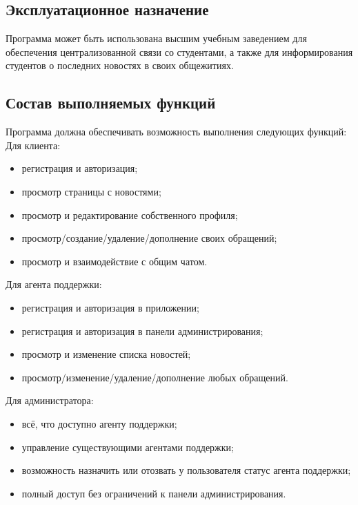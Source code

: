 \documentclass{../includes/TechDoc}
\begin{document}
    \subsection{Эксплуатационное назначение}

    Программа может быть использована высшим учебным заведением для обеспечения централизованной связи со студентами, а
    также для информирования студентов о последних новостях в своих общежитиях.

    \subsection{Состав выполняемых функций}

    Программа должна обеспечивать возможность выполнения следующих функций:\\

    Для клиента:
    \begin{itemize}[noitemsep]
        \item регистрация и авторизация;
        \item просмотр страницы с новостями;
        \item просмотр и редактирование собственного профиля;
        \item просмотр/создание/удаление/дополнение своих обращений;
        \item просмотр и взаимодействие с общим чатом.
    \end{itemize}

    Для агента поддержки:
    \begin{itemize}[noitemsep]
        \item регистрация и авторизация в приложении;
        \item регистрация и авторизация в панели администрирования;
        \item просмотр и изменение списка новостей;
        \item просмотр/изменение/удаление/дополнение любых обращений.
    \end{itemize}

    Для администратора:
    \begin{itemize}[noitemsep]
        \item всё, что доступно агенту поддержки;
        \item управление существующими агентами поддержки;
        \item возможность назначить или отозвать у пользователя статус агента поддержки;
        \item полный доступ без ограничений к панели администрирования.
    \end{itemize}
\end{document}

